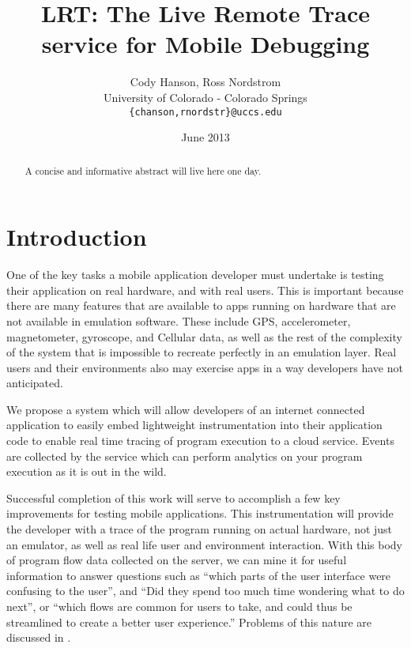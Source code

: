 \documentclass{acm_proc_article-sp}
\begin{document}
\title{LRT: The Live Remote Trace service for Mobile Debugging}
\author{Cody Hanson, Ross Nordstrom\\
        University of Colorado - Colorado Springs\\
        \texttt{\{chanson,rnordstr\}@uccs.edu}
       }
\date{June 2013}

\maketitle

\begin{abstract}
A concise and informative abstract will live here one day.
\end{abstract}

\section{Introduction}
One of the key tasks a mobile application developer must undertake is testing 
their application on real hardware, and with real users. This is important 
because there are many features that are available to apps running on hardware 
that are not available in emulation software. These include GPS, accelerometer, 
magnetometer, gyroscope, and Cellular data, as well as the rest of the 
complexity of the system that is impossible to recreate perfectly in an 
emulation layer. Real users and their environments also may exercise apps in
a way developers have not anticipated. 

We propose a system which will allow developers of an internet connected 
application to easily embed lightweight instrumentation 
into their application code to enable real 
time tracing of program execution to a cloud service. Events are collected by 
the service which can perform analytics on your program execution as it is out 
in the wild.

Successful completion of this work will serve to accomplish a few key 
improvements for testing mobile applications. This instrumentation will provide 
the developer with a trace of the program running on actual hardware, not just 
an emulator, as well as real life user and environment interaction. With this 
body of program flow data collected on the server, we can mine it for useful 
information to answer questions such as ``which parts of the user interface were 
confusing to the user'', and ``Did they spend too much time wondering what to do 
next'', or ``which flows are common for users to take, and could thus be 
streamlined to create a better user experience.'' Problems of this nature are 
discussed in \cite{WebAntiPattern}.
\end{document}
